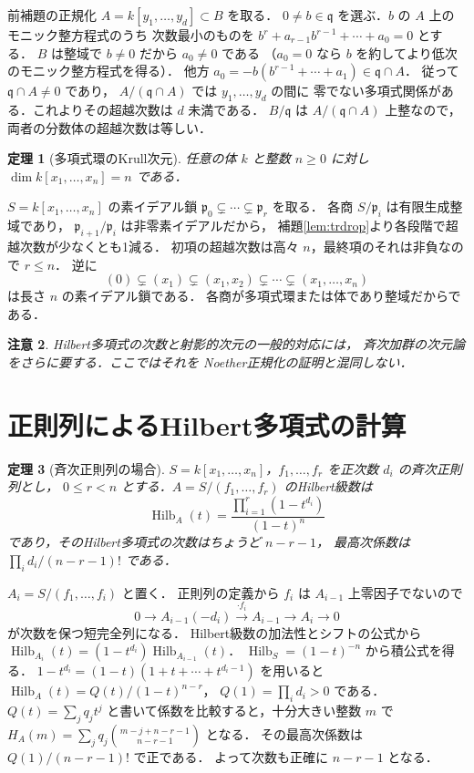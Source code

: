 \documentclass[a5paper,10pt,onecolumn]{jsarticle}
\makeatletter
\theoremstyle{mathnotetheorem}
\newtheorem{theorem}{定理}[section]
\newtheorem{remark}[theorem]{注意}
\renewcommand{\proofname}{証明}
\renewenvironment{proof}[1][\proofname]{%
  \par\pushQED{\qed}\normalfont\topsep4\p@\@plus2\p@\relax
  \trivlist\item[\hskip\labelsep\bfseries #1]\ignorespaces
}{\popQED\endtrivlist\@endpefalse}
\makeatother
\begin{document}
\begin{proof}
前補題の正規化 $A=k[y_1,\ldots,y_d]\subset B$ を取る．
$0\ne b\in\mathfrak q$ を選ぶ．$b$ の $A$ 上のモニック整方程式のうち
次数最小のものを $b^r+a_{r-1}b^{r-1}+\cdots+a_0=0$ とする．
$B$ は整域で $b\ne0$ だから $a_0\ne0$ である
（$a_0=0$ なら $b$ を約してより低次のモニック整方程式を得る）．
他方 $a_0=-b(b^{r-1}+\cdots+a_1)\in\mathfrak q\cap A$．
従って $\mathfrak q\cap A\ne0$ であり，
$A/(\mathfrak q\cap A)$ では $y_1,\ldots,y_d$ の間に
零でない多項式関係がある．これよりその超越次数は $d$ 未満である．
$B/\mathfrak q$ は $A/(\mathfrak q\cap A)$ 上整なので，
両者の分数体の超越次数は等しい．
\end{proof}
\begin{theorem}[多項式環のKrull次元]\label{thm:poly_dim}
任意の体 $k$ と整数 $n\ge0$ に対し
$\dim k[x_1,\ldots,x_n]=n$ である．
\end{theorem}
\begin{proof}
$S=k[x_1,\ldots,x_n]$ の素イデアル鎖
$\mathfrak p_0\subsetneq\cdots\subsetneq\mathfrak p_r$ を取る．
各商 $S/\mathfrak p_i$ は有限生成整域であり，
$\mathfrak p_{i+1}/\mathfrak p_i$ は非零素イデアルだから，
補題\ref{lem:trdrop}より各段階で超越次数が少なくとも1減る．
初項の超越次数は高々 $n$，最終項のそれは非負なので $r\le n$．
逆に
\[
 (0)\subsetneq(x_1)\subsetneq(x_1,x_2)
 \subsetneq\cdots\subsetneq(x_1,\ldots,x_n)
\]
は長さ $n$ の素イデアル鎖である．
各商が多項式環または体であり整域だからである．
\end{proof}
\begin{remark}
Hilbert多項式の次数と射影的次元の一般的対応には，
斉次加群の次元論をさらに要する．ここではそれを
Noether正規化の証明と混同しない．
\end{remark}
\section{正則列によるHilbert多項式の計算}
\begin{theorem}[斉次正則列の場合]
$S=k[x_1,\ldots,x_n]$，$f_1,\ldots,f_r$ を正次数 $d_i$ の斉次正則列とし，
$0\le r<n$ とする．$A=S/(f_1,\ldots,f_r)$ のHilbert級数は
\[
 \operatorname{Hilb}_A(t)
 =\frac{\prod_{i=1}^r(1-t^{d_i})}{(1-t)^n}
\]
であり，そのHilbert多項式の次数はちょうど $n-r-1$，
最高次係数は $\prod_i d_i/(n-r-1)!$ である．
\end{theorem}
\begin{proof}
$A_i=S/(f_1,\ldots,f_i)$ と置く．
正則列の定義から $f_i$ は $A_{i-1}$ 上零因子でないので
\[
 0\to A_{i-1}(-d_i)\xrightarrow{\cdot f_i}A_{i-1}
 \to A_i\to0
\]
が次数を保つ短完全列になる．
Hilbert級数の加法性とシフトの公式から
$\operatorname{Hilb}_{A_i}(t)=(1-t^{d_i})
\operatorname{Hilb}_{A_{i-1}}(t)$．
$\operatorname{Hilb}_S=(1-t)^{-n}$ から積公式を得る．
$1-t^{d_i}=(1-t)(1+t+\cdots+t^{d_i-1})$ を用いると
$\operatorname{Hilb}_A(t)=Q(t)/(1-t)^{n-r}$，
$Q(1)=\prod_i d_i>0$ である．
$Q(t)=\sum_j q_jt^j$ と書いて係数を比較すると，十分大きい整数 $m$ で
$H_A(m)=\sum_j q_j{m-j+n-r-1\choose n-r-1}$ となる．
その最高次係数は $Q(1)/(n-r-1)!$ で正である．
よって次数も正確に $n-r-1$ となる．
\end{proof}
\end{document}
